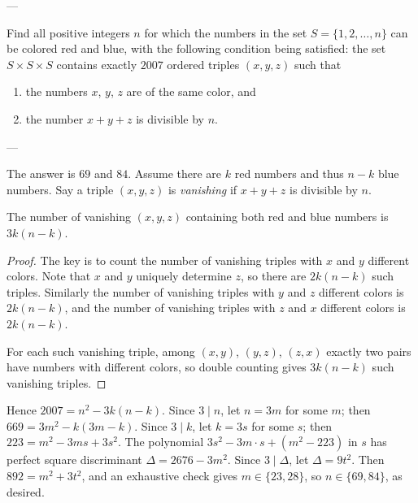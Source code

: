 
---

Find all positive integers $n$ for which the numbers in the set $S=\{1,2,\ldots,n\}$ can be colored red and blue, with the following condition being satisfied: the set $S\times S\times S$ contains exactly $2007$ ordered triples $(x,y,z)$ such that
\begin{enumerate}[label=(\roman*),itemsep=0em]
    \item the numbers $x$, $y$, $z$ are of the same color, and
    \item the number $x+y+z$ is divisible by $n$.
\end{enumerate}

---

The answer is $69$ and $84$. Assume there are $k$ red numbers and thus $n-k$ blue numbers. Say a triple $(x,y,z)$ is \emph{vanishing} if $x+y+z$ is divisible by $n$.
\begin{iclaim*}
    The number of vanishing $(x,y,z)$ containing both red and blue numbers is $3k(n-k)$.
\end{iclaim*}
\begin{proof}
    The key is to count the number of vanishing triples with $x$ and $y$ different colors. Note that $x$ and $y$ uniquely determine $z$, so there are $2k(n-k)$ such triples. Similarly the number of vanishing triples with $y$ and $z$ different colors is $2k(n-k)$, and the number of vanishing triples with $z$ and $x$ different colors is $2k(n-k)$.

    For each such vanishing triple, among $(x,y)$, $(y,z)$, $(z,x)$ exactly two pairs have numbers with different colors, so double counting gives $3k(n-k)$ such vanishing triples.
\end{proof}

Hence $2007=n^2-3k(n-k)$. Since $3\mid n$, let $n=3m$ for some $m$; then $669=3m^2-k(3m-k)$. Since $3\mid k$, let $k=3s$ for some $s$; then $223=m^2-3ms+3s^2$. The polynomial $3s^2-3m\cdot s+(m^2-223)$ in $s$ has perfect square discriminant $\Delta=2676-3m^2$. Since $3\mid\Delta$, let $\Delta=9t^2$. Then $892=m^2+3t^2$, and an exhaustive check gives $m\in\{23,28\}$, so $n\in\{69,84\}$, as desired.

